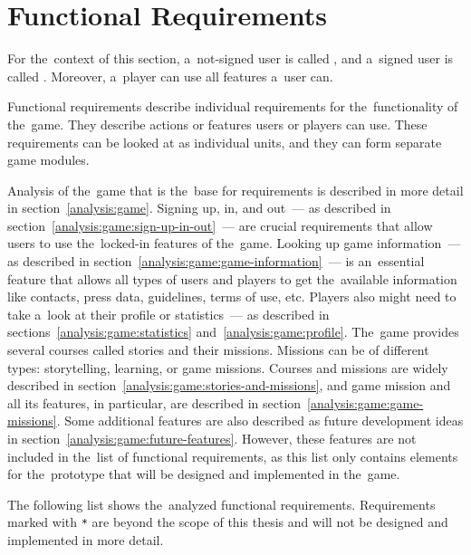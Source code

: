 \section{Functional Requirements}

For the~context of this section, a~not-signed user is called , and a~signed user is called .
Moreover, a~player can use all features a~user can. 

Functional requirements describe individual requirements for the~functionality of the~game.
They describe actions or features users or players can use.
These requirements can be looked at as individual units, and they can form separate game modules.

Analysis of the~game that is the~base for requirements is described in more detail in section~\ref{analysis:game}.
Signing up, in, and out~--- as described in section~\ref{analysis:game:sign-up-in-out}~--- are crucial requirements that allow users to use the~locked-in features of the~game.
Looking up game information~--- as described in section~\ref{analysis:game:game-information}~--- is an~essential feature that allows all types of users and players to get the~available information like contacts, press data, guidelines, terms of use, etc.
Players also might need to take a~look at their profile or statistics~--- as described in sections~\ref{analysis:game:statistics} and~\ref{analysis:game:profile}.
The~game provides several courses called stories and their missions.
Missions can be of different types: storytelling, learning, or game missions.
Courses and missions are widely described in section~\ref{analysis:game:stories-and-missions}, and game mission and all its features, in particular, are described in section~\ref{analysis:game:game-missions}.
Some additional features are also described as future development ideas in section~\ref{analysis:game:future-features}.
However, these features are not included in the~list of functional requirements, as this list only contains elements for the~prototype that will be designed and implemented in the~game.

The following list shows the~analyzed functional requirements.
Requirements marked with \texttt{*} are beyond the scope of this thesis and will not be designed and implemented in more detail.

